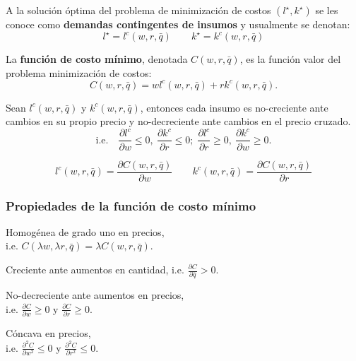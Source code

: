 \documentclass[8pt,a4paper]{extarticle}
\begin{document}
\begin{multicols}{3}
\begin{boxdef}
A la solución óptima del problema de minimización de costos $(l^\star, k^\star)$ se les conoce como \textbf{demandas contingentes de insumos} y usualmente se denotan:
\[
	l^\star = l^c (w, r, \bar{q}) \qquad k^\star = k^c (w, r, \bar{q})
\] 
\end{boxdef}

\begin{boxdef}
La \textbf{función de costo mínimo}, denotada $C(w, r, \bar{q})$, es la función valor del problema minimización de costos:
	\[
		C(w, r, \bar{q}) = w l^c (w, r, \bar{q}) + r k^c (w, r, \bar{q})
	.\] 
\end{boxdef}

\begin{boxtheo}
	Sean $l^c (w, r, \bar{q})$ y $k^c (w, r, \bar{q})$, entonces cada insumo es no-creciente ante cambios en su propio precio y no-decreciente ante cambios en el precio cruzado.
	\[
		\text{i.e.}\quad \frac{\partial l^c}{\partial w} \le 0,\ \frac{\partial k^c}{\partial r} \le 0;\; \frac{\partial l^c}{\partial r} \ge 0,\ \frac{\partial k^c}{\partial w} \ge 0
	.\] 
\end{boxtheo}

\begin{boxlemma}
	\[
		l^c (w, r, \bar{q}) = \frac{\partial C(w, r, \bar{q})}{\partial w} \qquad k^c (w, r, \bar{q}) = \frac{\partial C(w, r, \bar{q})}{\partial r}
	\] 
\end{boxlemma}

\subsubsection{Propiedades de la función de costo mínimo}

\begin{eqlist}
\item Homogénea de grado uno en precios, \\ i.e. $C(\lambda w, \lambda r, \bar{q}) = \lambda C(w, r, \bar{q}) $.
\item Creciente ante aumentos en cantidad, i.e. $\displaystyle \frac{\partial C}{\partial \bar{q}} > 0 $.
\item No-decreciente ante aumentos en precios, \\ i.e. $\displaystyle \frac{\partial C}{\partial w} \ge 0$ y $\displaystyle \frac{\partial C}{\partial r} \ge 0$.
\item Cóncava en precios, \\ i.e. $\displaystyle \frac{\partial^2 C}{\partial w^2} \le 0$ y $\displaystyle \frac{\partial^2 C}{\partial r^2} \le 0$.
\end{eqlist}


\end{multicols}
\end{document}
